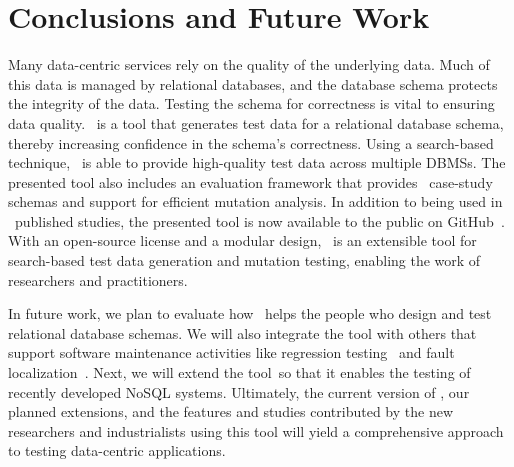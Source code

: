 \section{Conclusions and Future Work}\label{sec:conclusion}


Many data-centric services rely on the quality of the underlying data. Much of this data is managed by relational
databases, and the database schema protects the integrity of the data.  Testing the schema for correctness is vital to
ensuring data quality. \sa~is a tool that generates test data for a relational database schema, thereby increasing
confidence in the schema's correctness. Using a search-based technique, \sa~is able to provide high-quality test data
across multiple DBMSs. The presented tool also includes an evaluation framework that provides
\numprovidedschemas~case-study schemas and support for efficient mutation analysis. In addition to being used in
\numuniquepapers~published studies, the presented tool is now available to the public on GitHub~\cite{tool}. With an
open-source license and a modular design, \sa~is an extensible tool for search-based test data generation and mutation
testing, enabling the work of researchers and practitioners.


In future work, we plan to evaluate how \sa~helps the people who design and test relational database schemas. We will
also integrate the tool with others that support software maintenance activities like regression
testing~\cite{Kapfhammer2008} and fault localization~\cite{Clark2011}. Next, we will extend the tool~so that it enables
the testing of recently developed NoSQL systems. Ultimately, the current version of \sa, our planned extensions, and the
features and studies contributed by the new researchers and industrialists using this tool will yield a comprehensive
approach to testing data-centric applications.
